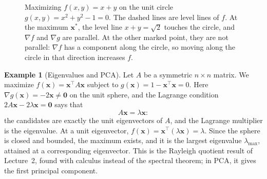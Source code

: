 \documentclass[11pt]{article}
\theoremstyle{definition}
\newtheorem{example}[definition]{Example}
\theoremstyle{plain}
\theoremstyle{remark}
\begin{document}
\begin{figure}[ht]
    \centering
    \caption{Maximizing $f(x, y) = x + y$ on the unit circle $g(x, y) = x^2 + y^2 - 1 = 0$. The dashed lines are level lines of $f$. At the maximum $\mathbf{x}^*$, the level line $x + y = \sqrt{2}$ touches the circle, and $\nabla f$ and $\nabla g$ are parallel. At the other marked point, they are not parallel: $\nabla f$ has a component along the circle, so moving along the circle in that direction increases $f$.}
    \label{fig:lagrange}
\end{figure}

\begin{example}[Eigenvalues and PCA]\label{ex:lagrange-eigen}
    Let $A$ be a symmetric $n \times n$ matrix. We maximize $f(\mathbf{x}) = \mathbf{x}^\top A\mathbf{x}$ subject to $g(\mathbf{x}) = 1 - \mathbf{x}^\top\mathbf{x} = 0$. Here $\nabla g(\mathbf{x}) = -2\mathbf{x} \neq \mathbf{0}$ on the unit sphere, and the Lagrange condition $2A\mathbf{x} - 2\lambda\mathbf{x} = \mathbf{0}$ says that
    \[A\mathbf{x} = \lambda\mathbf{x}:\]
    the candidates are exactly the unit eigenvectors of $A$, and the Lagrange multiplier is the eigenvalue. At a unit eigenvector, $f(\mathbf{x}) = \mathbf{x}^\top(\lambda\mathbf{x}) = \lambda$. Since the sphere is closed and bounded, the maximum exists, and it is the largest eigenvalue $\lambda_{\max}$, attained at a corresponding eigenvector. This is the Rayleigh quotient result of Lecture~2, found with calculus instead of the spectral theorem; in PCA, it gives the first principal component.
\end{example}
\end{document}
